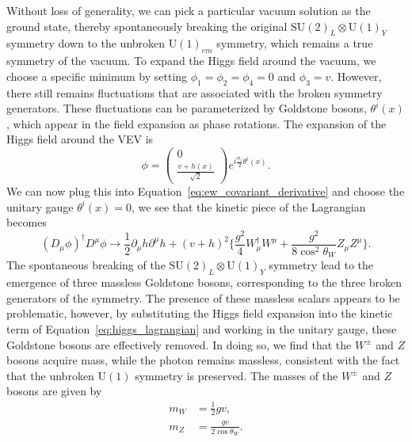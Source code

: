 Without loss of generality, we can pick a particular vacuum solution as the ground state, thereby spontaneously breaking the original $\mathrm{SU}{(2)}_{L} \otimes \mathrm{U}{(1)}_{Y}$ symmetry down to the unbroken $\mathrm{U}{(1)}_{em}$ symmetry, which remains a true symmetry of the vacuum. To expand the Higgs field around the vacuum, we choose a specific minimum by setting $\phi_{1}=\phi_{2}=\phi_{4} = 0$ and $\phi_{3} = v$. However, there still remains fluctuations that are associated with the broken symmetry generators. These fluctuations can be parameterized by Goldstone bosons, $\theta^{i}(x)$, which appear in the field expansion as phase rotations. The expansion of the Higgs field around the VEV is
\begin{equation}
  \phi = \begin{pmatrix}
    0 \\
    \frac{v + h(x)}{\sqrt{2}}
  \end{pmatrix} e^{i\frac{\sigma_{i}}{2}\theta^{i}(x)}.
  \label{eq:higgs_expansion}
\end{equation}
We can now plug this into Equation~\ref{eq:ew_covariant_derivative} and choose the unitary gauge $\theta^{i}(x) = 0$, we see that the kinetic piece of the Lagrangian becomes
\begin{equation}
  {(D_{\mu}\phi)}^{\dagger}D^{\mu}\phi \rightarrow \frac{1}{2}\partial_{\mu}h\partial^{\mu}h + {(v+h)}^{2}\{\frac{g^{2}}{4}W_{\mu}^{\dagger}W^{\mu} + \frac{g^{2}}{8\cos^2{\theta_{W}}}Z_{\mu}Z^{\mu}   \}.
\end{equation}
The spontaneous breaking of the $\mathrm{SU}{(2)}_{L} \otimes \mathrm{U}{(1)}_{Y}$ symmetry lead to the emergence of three massless Goldstone bosons, corresponding to the three broken generators of the symmetry. The presence of these massless scalars appears to be problematic, however, by substituting the Higgs field expansion into the kinetic term of Equation~\ref{eq:higgs_lagrangian} and working in the unitary gauge, these Goldstone bosons are effectively removed. In doing so, we find that the $W^\pm$ and $Z$ bosons acquire mass, while the photon remains massless, consistent with the fact that the unbroken $\mathrm{U}(1)$ symmetry is preserved. The masses of the $W^\pm$ and $Z$ bosons are given by
\begin{align}
  m_{W} &= \frac{1}{2}g v, \\
  m_{Z} &= \frac{gv}{2\cos{\theta_{W}}}.
  \label{eq:higgs_masses}
\end{align}

